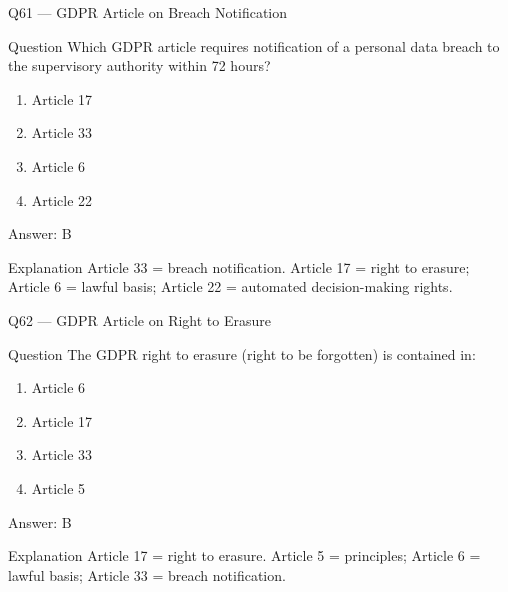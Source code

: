 \documentclass[aspectratio=169,8pt]{beamer}
\begin{document}
	\begin{frame}{Q61 --- GDPR Article on Breach Notification}
		\begin{block}{Question}
			Which GDPR article requires notification of a personal data breach to the supervisory authority within 72 hours?
			\begin{enumerate}
				\item Article 17
				\item Article 33
				\item Article 6
				\item Article 22
			\end{enumerate}
		\end{block}
		\begin{exampleblock}{Answer: B}\end{exampleblock}
		\begin{block}{Explanation}
			Article 33 = breach notification. Article 17 = right to erasure; Article 6 = lawful basis; Article 22 = automated decision-making rights.
		\end{block}
	\end{frame}
	
	\begin{frame}{Q62 --- GDPR Article on Right to Erasure}
		\begin{block}{Question}
			The GDPR right to erasure (right to be forgotten) is contained in:
			\begin{enumerate}
				\item Article 6
				\item Article 17
				\item Article 33
				\item Article 5
			\end{enumerate}
		\end{block}
		\begin{exampleblock}{Answer: B}\end{exampleblock}
		\begin{block}{Explanation}
			Article 17 = right to erasure. Article 5 = principles; Article 6 = lawful basis; Article 33 = breach notification.
		\end{block}
	\end{frame}
	
\end{document}
